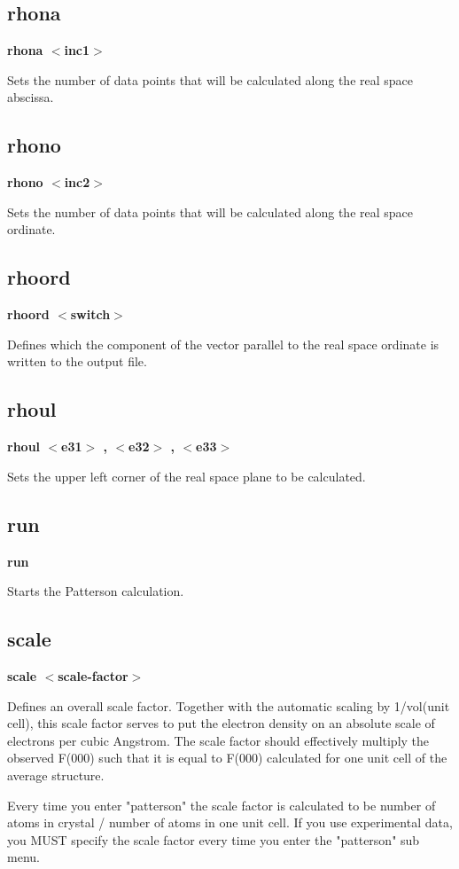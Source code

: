 \subsection*{rhona}
{\bf rhona $ <$inc1$> $ \par }
\par
\vspace{3pt}
Sets the number of data points that will be calculated along the 
real space abscissa. 
\subsection*{rhono}
{\bf rhono $ <$inc2$> $ \par }
\par
\vspace{3pt}
Sets the number of data points that will be calculated along the 
real space ordinate. 
\subsection*{rhoord}
{\bf rhoord $ <$switch$> $ \par }
\par
\vspace{3pt}
Defines which the component of the vector parallel to the 
real space ordinate is written to the output file. 
\subsection*{rhoul}
{\bf rhoul $ <$e31$> $ , $ <$e32$> $ , $ <$e33$> $ \par }
\par
\vspace{3pt}
Sets the upper left corner of the real space plane to be calculated. 
\subsection*{run}
{\bf run \par }
\par
\vspace{3pt}
Starts the Patterson calculation. 
\subsection*{scale}
{\bf scale $ <$scale-factor$> $ \par }
\par
\vspace{3pt}
Defines an overall scale factor. Together with the automatic scaling 
by 1/vol(unit cell), this scale factor serves to put the electron 
density on an absolute scale of electrons per cubic Angstrom. The 
scale factor should effectively multiply the observed F(000) such that 
it is equal to F(000) calculated for one unit cell of the average 
structure. 
\par
Every time you enter "patterson" the scale factor is calculated to be 
number of atoms in crystal / number of atoms in one unit cell. If you 
use experimental data, you MUST specify the scale factor every time you 
enter the "patterson" sub menu. 
